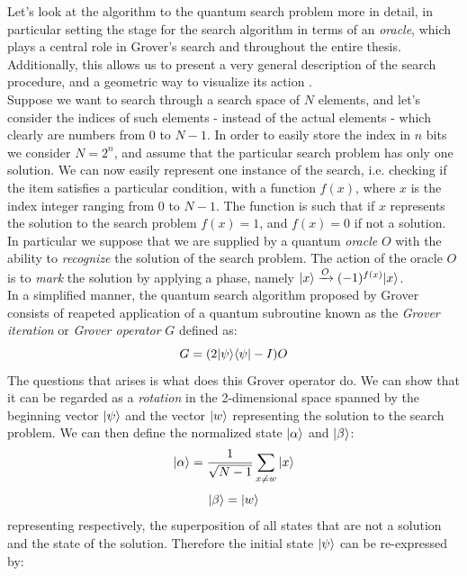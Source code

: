\noindent
Let's look at the algorithm to the quantum search problem more in detail, in particular setting the stage for the search algorithm in terms of an \textit{oracle}, which plays a central role in Grover's search and throughout the entire thesis. Additionally, this allows us to present a very general description of the search procedure, and a geometric way to visualize its action \cite{Nielsen2000}. \\

\noindent
Suppose we want to search through a search space of $N$ elements, and let's consider the indices of such elements - instead of the actual elements - which clearly are numbers from 0 to $N-1$. In order to easily store the index in $n$ bits we consider $N=2^n$, and assume that the particular search problem has only one solution. We can now easily represent one instance of the search, i.e. checking if the item satisfies a particular condition, with a function $f(x)$, where $x$ is the index integer ranging from 0 to $N-1$. The function is such that if $x$ represents the solution to the search problem $f(x)=1$, and $f(x)=0$ if not a solution. In particular we suppose that we are supplied by a quantum \textit{oracle} $O$ with the ability to \textit{recognize} the solution of the search problem. The action of the oracle $O$ is to \textit{mark} the solution by applying a phase, namely ${|{x}\rangle}\xrightarrow{O}(-1)^{f(x)}{|{x}\rangle}$. \\ In a simplified manner, the quantum search algorithm proposed by Grover consists of reapeted application of a quantum subroutine known as the \textit{Grover iteration} or \textit{Grover operator} $G$ defined as:
\begin{equation}
  G = (2{|{\psi}\rangle}{\langle{\psi}|}-I)O
\end{equation}
The questions that arises is what does this Grover operator do. We can show that it can be regarded as a \textit{rotation} in the 2-dimensional space spanned by the beginning vector ${|{\psi}\rangle}$ and the vector ${|{w}\rangle}$ representing the solution to the search problem. We can then define the normalized state ${|{\alpha}\rangle}$ and ${|{\beta}\rangle}$:
\begin{equation}
    {|{\alpha}\rangle} = \frac{1}{\sqrt{N-1}}\sum_{x\neq w}{|{x}\rangle}
\end{equation}
\vspace{-0.5cm}
\begin{equation}
  {|{\beta}\rangle} = {|{w}\rangle}
\end{equation}
representing respectively, the superposition of all states that are not a solution and the state of the solution. Therefore the initial state ${|{\psi}\rangle}$ can be re-expressed by:
